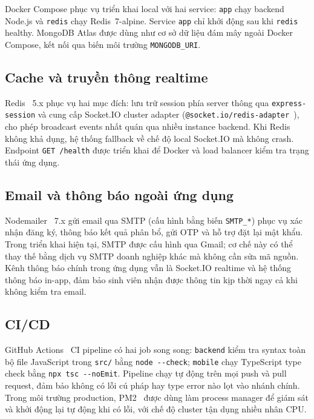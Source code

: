 \documentclass[../DoAn.tex]{subfiles}
\begin{document}
Docker Compose phục vụ triển khai local với hai service: \texttt{app} chạy
backend Node.js và \texttt{redis} chạy Redis~7-alpine. Service \texttt{app}
chỉ khởi động sau khi \texttt{redis} healthy. MongoDB Atlas được dùng như cơ
sở dữ liệu đám mây ngoài Docker Compose, kết nối qua biến môi trường
\texttt{MONGODB\_URI}.

\subsection*{Cache và truyền thông realtime}

Redis~\cite{redis2024pubsub} 5.x phục vụ hai mục đích: lưu trữ session phía
server thông qua \texttt{express-session} và cung cấp Socket.IO cluster adapter
(\texttt{@socket.io/redis-adapter}~\cite{socketio2024docs}), cho phép broadcast
events nhất quán qua nhiều instance backend. Khi Redis không khả dụng, hệ
thống fallback về chế độ local Socket.IO mà không crash. Endpoint
\texttt{GET /health} được triển khai để Docker và load balancer kiểm tra
trạng thái ứng dụng.

\subsection*{Email và thông báo ngoài ứng dụng}

Nodemailer~\cite{nodemailer_docs} 7.x gửi email qua SMTP (cấu hình bằng biến
\texttt{SMTP\_*}) phục vụ xác nhận đăng ký, thông báo kết quả phân bổ, gửi
OTP và hỗ trợ đặt lại mật khẩu. Trong triển khai hiện tại, SMTP được cấu hình
qua Gmail; cơ chế này có thể thay thế bằng dịch vụ SMTP doanh nghiệp khác mà
không cần sửa mã nguồn. Kênh thông báo chính trong ứng dụng vẫn là Socket.IO
realtime và hệ thống thông báo in-app, đảm bảo sinh viên nhận được thông tin
kịp thời ngay cả khi không kiểm tra email.

\subsection*{CI/CD}

GitHub Actions~\cite{github_actions} CI pipeline có hai job song song:
\texttt{backend} kiểm tra syntax toàn bộ file JavaScript trong \texttt{src/}
bằng \texttt{node -{}-check}; \texttt{mobile} chạy TypeScript type check bằng
\texttt{npx tsc -{}-noEmit}. Pipeline chạy tự động trên mọi push và pull
request, đảm bảo không có lỗi cú pháp hay type error nào lọt vào nhánh chính.
Trong môi trường production, PM2~\cite{pm2_docs} được dùng làm process manager
để giám sát và khởi động lại tự động khi có lỗi, với chế độ cluster tận dụng
nhiều nhân CPU.
\end{document}
